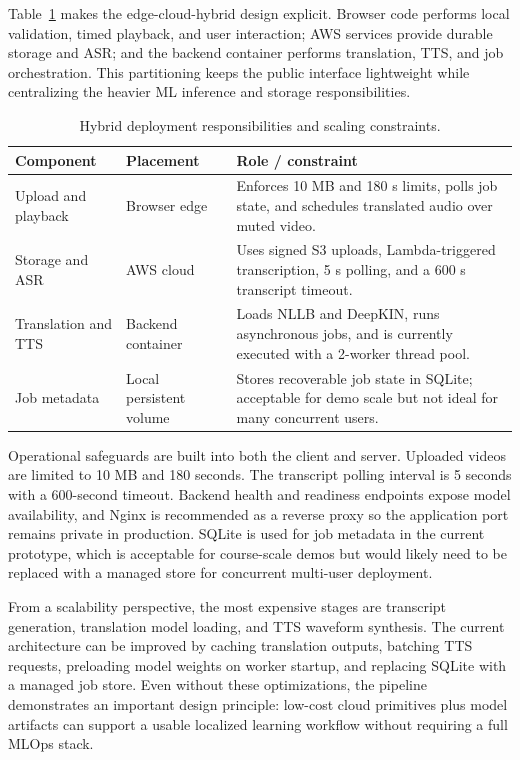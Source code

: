 \documentclass[conference]{IEEEtran}
\begin{document}
Table~\ref{tab:deployment} makes the edge-cloud-hybrid design explicit. Browser code performs local validation, timed playback, and user interaction; AWS services provide durable storage and ASR; and the backend container performs translation, TTS, and job orchestration. This partitioning keeps the public interface lightweight while centralizing the heavier ML inference and storage responsibilities.

\begin{table}[H]
\centering
\caption{Hybrid deployment responsibilities and scaling constraints.}
\label{tab:deployment}
\scriptsize
\renewcommand{\arraystretch}{1.2}
\begin{tabular}{p{}p{}p{}}
\toprule
Component & Placement & Role / constraint \\
\midrule
Upload and playback & Browser edge & Enforces 10 MB and 180 s limits, polls job state, and schedules translated audio over muted video. \\
Storage and ASR & AWS cloud & Uses signed S3 uploads, Lambda-triggered transcription, 5 s polling, and a 600 s transcript timeout. \\
Translation and TTS & Backend container & Loads NLLB and DeepKIN, runs asynchronous jobs, and is currently executed with a 2-worker thread pool. \\
Job metadata & Local persistent volume & Stores recoverable job state in SQLite; acceptable for demo scale but not ideal for many concurrent users. \\
\bottomrule
\end{tabular}
\normalsize
\end{table}

Operational safeguards are built into both the client and server. Uploaded videos are limited to 10 MB and 180 seconds. The transcript polling interval is 5 seconds with a 600-second timeout. Backend health and readiness endpoints expose model availability, and Nginx is recommended as a reverse proxy so the application port remains private in production. SQLite is used for job metadata in the current prototype, which is acceptable for course-scale demos but would likely need to be replaced with a managed store for concurrent multi-user deployment.

From a scalability perspective, the most expensive stages are transcript generation, translation model loading, and TTS waveform synthesis. The current architecture can be improved by caching translation outputs, batching TTS requests, preloading model weights on worker startup, and replacing SQLite with a managed job store. Even without these optimizations, the pipeline demonstrates an important design principle: low-cost cloud primitives plus model artifacts can support a usable localized learning workflow without requiring a full MLOps stack.
\end{document}

